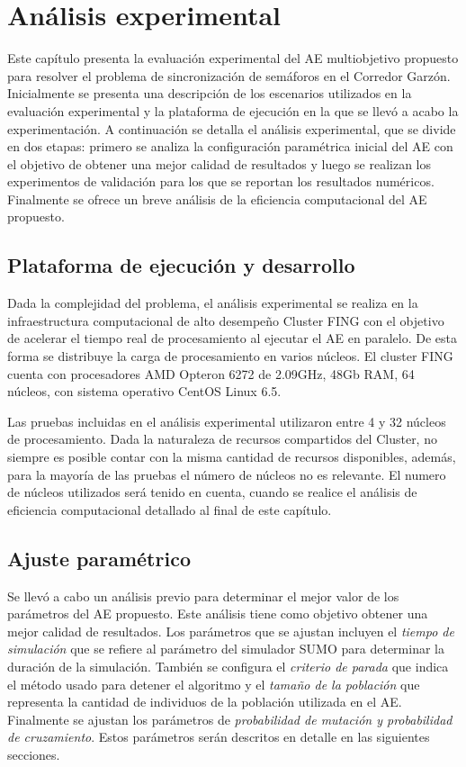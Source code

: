 \chapter{Análisis experimental}
Este capítulo presenta la evaluación experimental del AE multiobjetivo propuesto para resolver el problema de sincronización de semáforos en el Corredor Garzón. Inicialmente se presenta una descripción de los escenarios utilizados en la evaluación experimental y la plataforma de ejecución en la que se llevó a acabo la experimentación. A continuación se detalla el análisis experimental, que se divide en dos etapas: primero se analiza la configuración paramétrica inicial del AE con el objetivo de obtener una mejor calidad de resultados y luego se realizan los experimentos de validación para los que se reportan los resultados numéricos. Finalmente se ofrece un breve análisis de la eficiencia computacional del AE propuesto.



\section{Plataforma de ejecución y desarrollo}

Dada la complejidad del problema, el análisis experimental se realiza en la infraestructura computacional de alto desempeño Cluster FING \citep{nesmachnow2010computacion} con el objetivo de acelerar el tiempo real de procesamiento al ejecutar el AE en paralelo. De esta forma se distribuye la carga de procesamiento en varios núcleos. El cluster FING cuenta con procesadores AMD Opteron 6272 de 2.09GHz, 48Gb RAM, 64 núcleos, con sistema operativo CentOS Linux 6.5.

Las pruebas incluidas en el análisis experimental utilizaron entre 4 y 32 núcleos de procesamiento. Dada la naturaleza de recursos compartidos del Cluster, no siempre es posible contar con la misma cantidad de recursos disponibles, además, para la mayoría de las pruebas el número de núcleos no es relevante. El numero de núcleos utilizados será tenido en cuenta, cuando se realice el análisis de eficiencia computacional detallado al final de este capítulo.


\section{Ajuste paramétrico}
Se llevó a cabo un análisis previo para determinar el mejor valor de los parámetros del AE propuesto. Este análisis tiene como objetivo obtener una mejor calidad de resultados. Los parámetros que se ajustan incluyen el \emph{tiempo de simulación} que se refiere al parámetro del simulador SUMO para determinar la duración de la simulación. También se configura el \emph{criterio de parada} que indica el método usado para detener el algoritmo y el \emph{tamaño de la población} que representa la cantidad de individuos de la población utilizada en el AE. Finalmente se ajustan los parámetros de \emph{probabilidad de mutación y probabilidad de cruzamiento}. Estos parámetros serán descritos en detalle en las siguientes secciones.

